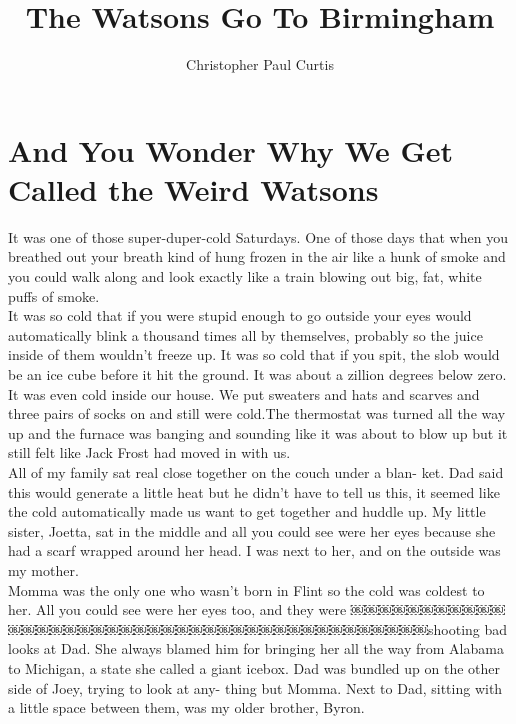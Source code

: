 \documentclass{standard}
\title{The Watsons Go To Birmingham}
\author{Christopher Paul Curtis}
\date{}
\begin{document}
\maketitle
\newpage


\section{And You Wonder Why We Get Called the Weird Watsons}
It was one of those super-duper-cold Saturdays. One of those days that when you breathed out your breath kind of hung frozen in the air like a hunk of smoke and you could walk along and look exactly like a train blowing out big, fat, white puffs of smoke.\\

It was so cold that if you were stupid enough to go outside your eyes would automatically blink a thousand times all by themselves, probably so the juice inside of them wouldn’t freeze up. It was so cold that if you spit, the slob would be an ice cube before it hit the ground. It was about a zillion degrees below zero.\\

It was even cold inside our house. We put sweaters and hats and scarves and three pairs of socks on and still were cold.The thermostat was turned all the way up and the furnace was banging and sounding like it was about to blow up but it still felt like Jack Frost had moved in with us.\\

All of my family sat real close together on the couch under a blan- ket. Dad said this would generate a little heat but he didn’t have to tell us this, it seemed like the cold automatically made us want to get together and huddle up. My little sister, Joetta, sat in the middle and all you could see were her eyes because she had a scarf wrapped around her head. I was next to her, and on the outside was my mother.\\

Momma was the only one who wasn’t born in Flint so the cold was coldest to her. All you could see were her eyes too, and they were ￼￼￼￼￼￼￼￼￼￼￼￼￼￼￼￼￼￼￼￼￼￼￼￼￼￼￼￼￼￼￼￼￼￼￼￼￼￼￼￼￼shooting bad looks at Dad. She always blamed him for bringing her all the way from Alabama to Michigan, a state she called a giant icebox. Dad was bundled up on the other side of Joey, trying to look at any- thing but Momma. Next to Dad, sitting with a little space between them, was my older brother, Byron.\\
\end{document}
